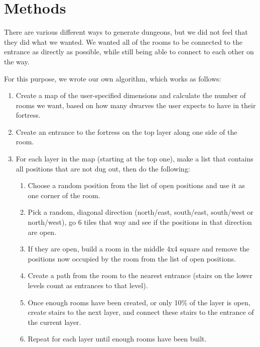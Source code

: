 \section{Methods}
\label{04}

There are various different ways to generate dungeons\cite[Chapter 3]{PCGBook}\cite{FearAI}, but we did not feel that they did what we wanted. We wanted all of the rooms to be connected to the entrance as directly as possible, while still being able to connect to each other on the way.

For this purpose, we wrote our own algorithm, which works as follows:

\begin{enumerate}

	\item Create a map of the user-specified dimensions and calculate the number of rooms we want, based on how many dwarves the user expects to have in their fortress.

	\item Create an entrance to the fortress on the top layer along one side of the room.

	\item For each layer in the map (starting at the top one), make a list that contains all positions that are not dug out, then do the following:

	\begin{enumerate}
		
		\item Choose a random position from the list of open positions and use it as one corner of the room.

		\item Pick a random, diagonal direction (north/east, south/east, south/west or north/west), go 6 tiles that way and see if the positions in that direction are open.

		\item If they are open, build a room in the middle 4x4 square and remove the positions now occupied by the room from the list of open positions.

		\item Create a path from the room to the nearest entrance (stairs on the lower levels count as entrances to that level).

		\item Once enough rooms have been created, or only 10\% of the layer is open, create stairs to the next layer, and connect these stairs to the entrance of the current layer.

		\item Repeat for each layer until enough rooms have been built.

	\end{enumerate}

\end{enumerate}

